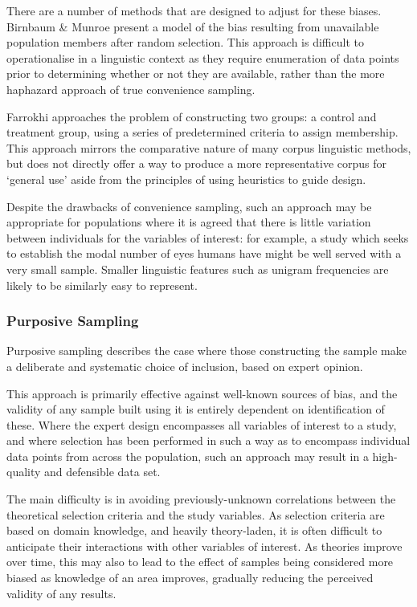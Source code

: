 There are a number of methods that are designed to adjust for these biases.  Birnbaum \& Munroe\cite{birnbaum1950munroe} present a model of the bias resulting from unavailable population members after random selection.  This approach is difficult to operationalise in a linguistic context as they require enumeration of data points prior to determining whether or not they are available, rather than the more haphazard approach of true convenience sampling.

Farrokhi\cite{farrokhi2012rethinking} approaches the problem of constructing two groups: a control and treatment group, using a series of predetermined criteria to assign membership.  This approach mirrors the comparative nature of many corpus linguistic methods, but does not directly offer a way to produce a more representative corpus for `general use' aside from the principles of using heuristics to guide design.

Despite the drawbacks of convenience sampling, such an approach may be appropriate for populations where it is agreed that there is little variation between individuals for the variables of interest: for example, a study which seeks to establish the modal number of eyes humans have might be well served with a very small sample.  Smaller linguistic features such as unigram frequencies are likely to be similarly easy to represent.



\subsubsection{Purposive Sampling}
Purposive sampling describes the case where those constructing the sample make a deliberate and systematic choice of inclusion, based on expert opinion.

This approach is primarily effective against well-known sources of bias, and the validity of any sample built using it is entirely dependent on identification of these.  Where the expert design encompasses all variables of interest to a study, and where selection has been performed in such a way as to encompass individual data points from across the population, such an approach may result in a high-quality and defensible data set.

The main difficulty is in avoiding previously-unknown correlations between the theoretical selection criteria and the study variables.  As selection criteria are based on domain knowledge, and heavily theory-laden, it is often difficult to anticipate their interactions with other variables of interest.  As theories improve over time, this may also to lead to the effect of samples being considered more biased as knowledge of an area improves, gradually reducing the perceived validity of any results.

